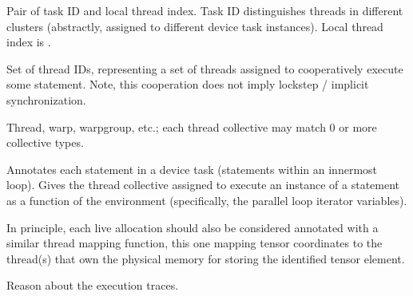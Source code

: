 
 Pair of task ID and local thread index.
Task ID distinguishes threads in different clusters
(abstractly, assigned to different device task instances).
Local thread index is .

 Set of thread IDs,
representing a set of threads assigned to cooperatively execute some
statement. Note, this cooperation does not imply lockstep / implicit synchronization.

 Thread, warp, warpgroup, etc.;
each thread collective may match 0 or more collective types.

 Annotates each statement in a device task
(statements within an innermost  loop).
Gives the thread collective assigned to execute an instance of a statement
as a function of the environment (specifically, the parallel loop iterator variables).

In principle, each live allocation should also be considered annotated with a similar thread mapping function,
this one mapping tensor coordinates to the thread(s) that own the physical memory for storing the identified tensor element.




Reason about the execution traces.



